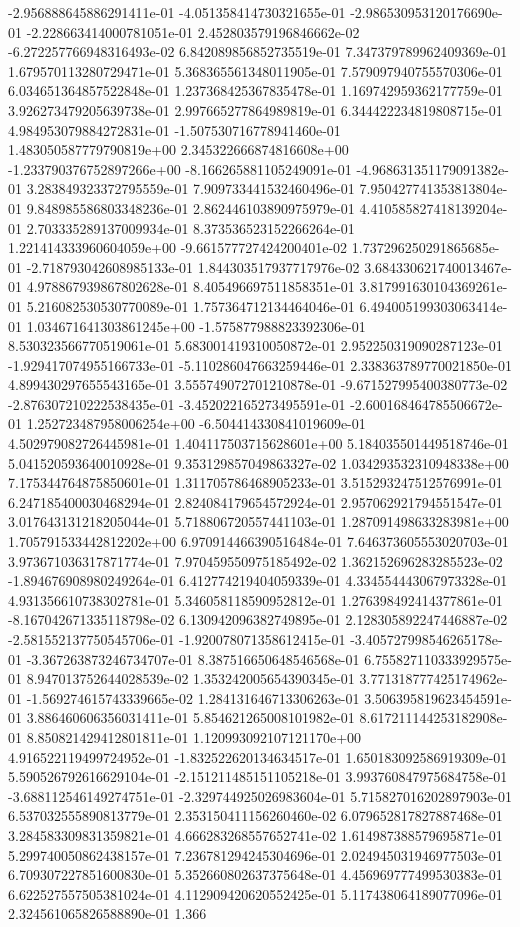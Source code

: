 	-2.956888645886291411e-01	-4.051358414730321655e-01	-2.986530953120176690e-01	-2.228663414000781051e-01	2.452803579196846662e-02	-6.272257766948316493e-02	6.842089856852735519e-01	7.347379789962409369e-01	1.679570113280729471e-01	5.368365561348011905e-01	7.579097940755570306e-01	6.034651364857522848e-01	1.237368425367835478e-01	1.169742959362177759e-01	3.926273479205639738e-01	2.997665277864989819e-01	6.344422234819808715e-01	4.984953079884272831e-01	-1.507530716778941460e-01	1.483050587779790819e+00	2.345322666874816608e+00	-1.233790376752897266e+00	-8.166265881105249091e-01	-4.968631351179091382e-01	3.283849323372795559e-01	7.909733441532460496e-01	7.950427741353813804e-01	9.848985586803348236e-01	2.862446103890975979e-01	4.410585827418139204e-01	2.703335289137009934e-01	8.373536523152266264e-01	1.221414333960604059e+00	-9.661577727424200401e-02	1.737296250291865685e-01	-2.718793042608985133e-01	1.844303517937717976e-02	3.684330621740013467e-01	4.978867939867802628e-01	8.405496697511858351e-01	3.817991630104369261e-01	5.216082530530770089e-01	1.757364712134464046e-01	6.494005199303063414e-01	1.034671641303861245e+00	-1.575877988823392306e-01	8.530323566770519061e-01	5.683001419310050872e-01	2.952250319090287123e-01	-1.929417074955166733e-01	-5.110286047663259446e-01	2.338363789770021850e-01	4.899430297655543165e-01	3.555749072701210878e-01	-9.671527995400380773e-02	-2.876307210222538435e-01	-3.452022165273495591e-01	-2.600168464785506672e-01	1.252723487958006254e+00	-6.504414330841019609e-01	4.502979082726445981e-01	1.404117503715628601e+00	5.184035501449518746e-01	5.041520593640010928e-01	9.353129857049863327e-02	1.034293532310948338e+00	7.175344764875850601e-01	1.311705786468905233e-01	3.515293247512576991e-01	6.247185400030468294e-01	2.824084179654572924e-01	2.957062921794551547e-01	3.017643131218205044e-01	5.718806720557441103e-01	1.287091498633283981e+00	1.705791533442812202e+00	6.970914466390516484e-01	7.646373605553020703e-01	3.973671036317871774e-01	7.970459550975185492e-02	1.362152696283285523e-02	-1.894676908980249264e-01	6.412774219404059339e-01	4.334554443067973328e-01	4.931356610738302781e-01	5.346058118590952812e-01	1.276398492414377861e-01	-8.167042671335118798e-02	6.130942096382749895e-01	2.128305892247446887e-02	-2.581552137750545706e-01	-1.920078071358612415e-01	-3.405727998546265178e-01	-3.367263873246734707e-01	8.387516650648546568e-01	6.755827110333929575e-01	8.947013752644028539e-02	1.353242005654390345e-01	3.771318777425174962e-01	-1.569274615743339665e-02	1.284131646713306263e-01	3.506395819623454591e-01	3.886460606356031411e-01	5.854621265008101982e-01	8.617211144253182908e-01	8.850821429412801811e-01	1.120993092107121170e+00	4.916522119499724952e-01	-1.832522620134634517e-01	1.650183092586919309e-01	5.590526792616629104e-01	-2.151211485151105218e-01	3.993760847975684758e-01	-3.688112546149274751e-01	-2.329744925026983604e-01	5.715827016202897903e-01	6.537032555890813779e-01	2.353150411156260460e-02	6.079652817827887468e-01	3.284583309831359821e-01	4.666283268557652741e-02	1.614987388579695871e-01	5.299740050862438157e-01	7.236781294245304696e-01	2.024945031946977503e-01	6.709307227851600830e-01	5.352660802637375648e-01	4.456969777499530383e-01	6.622527557505381024e-01	4.112909420620552425e-01	5.117438064189077096e-01	2.324561065826588890e-01	1.366